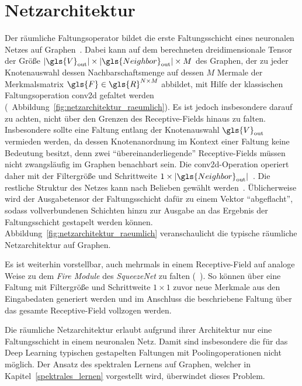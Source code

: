 \section{Netzarchitektur}
\label{raeumliche_netzarchitektur}

Der räumliche Faltungsoperator bildet die erste Faltungsschicht eines neuronalen Netzes auf Graphen~\cite{patchy}.
Dabei kann auf dem berechneten dreidimensionale Tensor der Größe $\left|\gls{V}_{\mathrm{out}}\right| \times \left|\gls{Neighbor}_{\mathrm{out}}\right| \times M$ des Graphen, der zu jeder Knotenauswahl dessen Nachbarschaftsmenge auf dessen $M$ Mermale der Merkmalsmatrix $\gls{F} \in \gls{R}^{N \times M}$ abbildet, mit Hilfe der klassischen Faltungsoperation \gls{conv2d} gefaltet werden (\vgl{}~Abbildung~\ref{fig:netzarchitektur_raeumlich}).
Es ist jedoch insbesondere darauf zu achten, nicht über den Grenzen des Receptive-Fields hinaus zu falten.
Insbesondere sollte eine Faltung entlang der Knotenauswahl $\gls{V}_{\mathrm{out}}$ vermieden werden, da dessen Knotenanordnung im Kontext einer Faltung keine Bedeutung besitzt, denn zwei \enquote{übereinanderliegende} Receptive-Fields müssen nicht zwangsläufig im Graphen benachbart sein.
Die \gls{conv2d}-Operation operiert daher mit der Filtergröße und Schrittweite $1 \times \left|\gls{Neighbor}_{\mathrm{out}}\right|$~\cite{patchy}.
Die restliche Struktur des Netzes kann nach Belieben gewählt werden~\cite{patchy}.
Üblicherweise wird der Ausgabetensor der Faltungsschicht dafür zu einem Vektor \enquote{abgeflacht}, sodass vollverbundenen Schichten hinzu zur Ausgabe an das Ergebnis der Faltungsschicht gestapelt werden können.
Abbildung~\ref{fig:netzarchitektur_raeumlich} veranschaulicht die typische räumliche Netzarchitektur auf Graphen.


Es ist weiterhin vorstellbar, auch mehrmals in einem Receptive-Field auf analoge Weise zu dem \emph{Fire Module} des \emph{SqueezeNet} zu falten (\vgl{}~\cite{squeeze}).
So können \zB{} über eine Faltung mit Filtergröße und Schrittweite $1 \times 1$ zuvor neue Merkmale aus den Eingabedaten generiert werden und im Anschluss die beschriebene Faltung über das gesamte Receptive-Field vollzogen werden.

Die räumliche Netzarchitektur erlaubt aufgrund ihrer Architektur nur eine Faltungsschicht in einem neuronalen Netz.
Damit sind insbesondere die für das Deep Learning typischen gestapelten Faltungen mit Poolingoperationen nicht möglich.
Der Ansatz des spektralen Lernens auf Graphen, welcher in Kapitel~\ref{spektrales_lernen} vorgestellt wird, überwindet dieses Problem.
